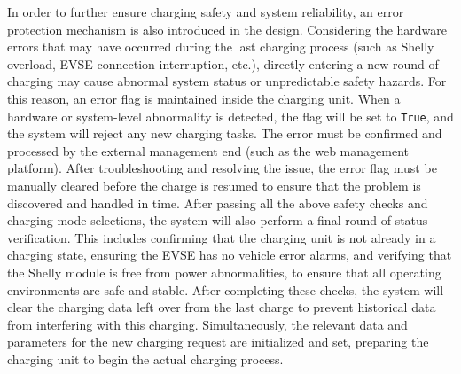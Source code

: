 \documentclass[
english,
ruledheaders=section,%
class=report,%
thesis={type=Report},%
accentcolor=9c,%
custommargins=true,%
marginpar=false,%
parskip=half-,%
fontsize=11pt,%
logofile={img/tuda_logo.pdf}, %
]{tudapub}
\begin{document}
\begin{enumerate}[label=\Alph*.]

        In order to further ensure charging safety and system reliability, an error protection mechanism is also introduced in the design. Considering the hardware errors that may have occurred during the last charging process (such as Shelly overload, EVSE connection interruption, etc.), directly entering a new round of charging may cause abnormal system status or unpredictable safety hazards. For this reason, an error flag is maintained inside the charging unit. When a hardware or system-level abnormality is detected, the flag will be set to \texttt{True}, and the system will reject any new charging tasks. The error must be confirmed and processed by the external management end (such as the web management platform). After troubleshooting and resolving the issue, the error flag must be manually cleared before the charge is resumed to ensure that the problem is discovered and handled in time.
        After passing all the above safety checks and charging mode selections, the system will also perform a final round of status verification. This includes confirming that the charging unit is not already in a charging state, ensuring the EVSE has no vehicle error alarms, and verifying that the Shelly module is free from power abnormalities, to ensure that all operating environments are safe and stable. After completing these checks, the system will clear the charging data left over from the last charge to prevent historical data from interfering with this charging. Simultaneously, the relevant data and parameters for the new charging request are initialized and set, preparing the charging unit to begin the actual charging process.




\end{enumerate}
\end{document}
